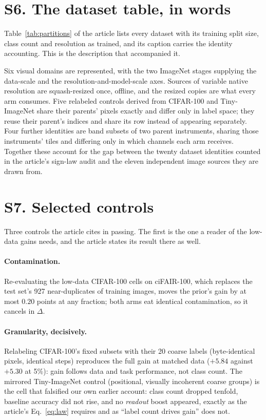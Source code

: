 \documentclass[11pt]{article}
\newcommand{\readout}{\textit{readout}}
\begin{document}
\section*{S6. The dataset table, in words}

Table~\ref{tab:partitions} of the article lists every dataset with its
training split size, class count and resolution as trained, and its caption
carries the identity accounting. This is the description that accompanied it.

Six visual domains are represented, with the two ImageNet stages supplying the
data-scale and the resolution-and-model-scale axes. Sources of variable native
resolution are squash-resized once, offline, and the resized copies are what
every arm consumes. Five relabeled controls derived from CIFAR-100 and
Tiny-ImageNet share their parents' pixels exactly and differ only in label
space; they reuse their parent's indices and share its row instead of
appearing separately. Four further identities are band subsets of two parent
instruments, sharing those instruments' tiles and differing only in which
channels each arm receives. Together these account for the gap between the
twenty dataset identities counted in the article's sign-law audit and the
eleven independent image sources they are drawn from.

\section*{S7. Selected controls}

Three controls the article cites in passing. The first is the one a reader of
the low-data gains needs, and the article states its result there as well.

\paragraph{Contamination.} Re-evaluating the low-data CIFAR-100 cells on
ciFAIR-100, which replaces the test set's 927 near-duplicates of training
images, moves the prior's gain by at most $0.20$ points at any fraction; both
arms eat identical contamination, so it cancels in $\Delta$.

\paragraph{Granularity, decisively.} Relabeling CIFAR-100's fixed subsets with
their 20 coarse labels (byte-identical pixels, identical steps) reproduces the
full gain at matched data ($+5.84$ against $+5.30$ at 5\%): gain follows data
and task performance, not class count. The mirrored Tiny-ImageNet control
(positional, visually incoherent coarse groups) is the cell that falsified our
own earlier account: class count dropped tenfold, baseline accuracy did not
rise, and no \readout{} boost appeared, exactly as the article's Eq.~\ref{eq:law} requires
and as ``label count drives gain'' does not.
\end{document}
